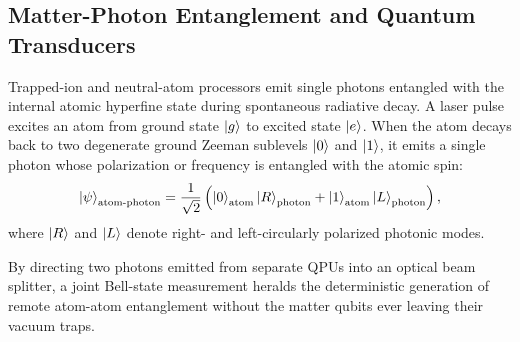 \subsection{Matter-Photon Entanglement and Quantum Transducers}
Trapped-ion and neutral-atom processors emit single photons entangled with the internal atomic hyperfine state during spontaneous radiative decay. A laser pulse excites an atom from ground state $\ket{g}$ to excited state $\ket{e}$. When the atom decays back to two degenerate ground Zeeman sublevels $\ket{0}$ and $\ket{1}$, it emits a single photon whose polarization or frequency is entangled with the atomic spin:
\begin{equation}
    \ket{\psi}_{\text{atom-photon}} = \frac{1}{\sqrt{2}} \left( \ket{0}_{\text{atom}}\ket{R}_{\text{photon}} + \ket{1}_{\text{atom}}\ket{L}_{\text{photon}} \right),
    \label{eq:atom_photon_entangle_ch3}
\end{equation}
where $\ket{R}$ and $\ket{L}$ denote right- and left-circularly polarized photonic modes.

By directing two photons emitted from separate QPUs into an optical beam splitter, a joint Bell-state measurement heralds the deterministic generation of remote atom-atom entanglement without the matter qubits ever leaving their vacuum traps.

